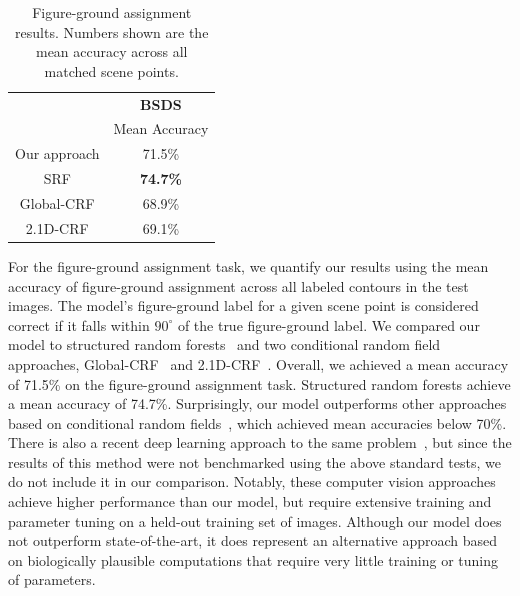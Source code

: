 \begin{table}[h!]
\centering
\begin{tabular}{|c|c|} 
 \cline{2-2}
 \multicolumn{1}{c}{} & \multicolumn{1}{|c|}{\textbf{BSDS}} \\
\cline{2-2}
 \multicolumn{1}{c|}{} & Mean Accuracy \\ 
 \hline
  Our approach & 71.5\% \\
 SRF & \textbf{74.7\%} \\
 Global-CRF & 68.9\% \\
 2.1D-CRF & 69.1\% \\
 \hline
\end{tabular}
\makeatletter
\let\@currsize\normalsize
\caption[Figure-ground assignment results]{Figure-ground assignment results. Numbers shown are the mean accuracy across all matched scene points.}
\label{tbl:Table2}
\end{table}

For the figure-ground assignment task, we quantify our results using the mean accuracy of figure-ground assignment across all labeled contours in the test images. The model's figure-ground label for a given scene point is considered correct if it falls within $90^{\circ}$ of the true figure-ground label. We compared our model to structured random forests~\citep[][SRF]{Teo_etal15} and two conditional random field approaches, Global-CRF~\citep{Ren_etal06} and 2.1D-CRF~\citep{Leichter_Lindenbaum09}. Overall, we achieved a mean accuracy of 71.5\% on the figure-ground assignment task. Structured random forests achieve a mean accuracy of 74.7\%. Surprisingly, our model outperforms other approaches based on conditional random fields~\citep{Ren_etal06,Leichter_Lindenbaum09}, which achieved mean accuracies below 70\%. There is also a recent deep learning approach to the same problem~\citep{Wang_Yuille16}, but since the results of this method were not benchmarked using the above standard tests, we do not include it in our comparison. Notably, these computer vision approaches achieve higher performance than our model, but require extensive training and parameter tuning on a held-out training set of images. Although our model does not outperform state-of-the-art, it does represent an alternative approach based on biologically plausible computations that require very little training or tuning of parameters.

